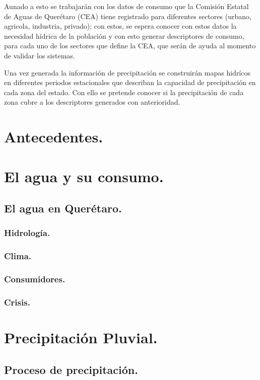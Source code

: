 \documentclass[letterpaper,12pt,oneside]{book}
\newcommand{\figura}[4]
{
  \begin{figure}[H]
    \centering
    \texttt{[image: \#2]}
    \caption{#3}
    \label{#4}
  \end{figure}
}
\begin{document}
    Aunado a esto se trabajarán con los datos de consumo que la Comisión Estatal de Aguas de Querétaro (CEA) tiene  registrado para diferentes sectores (urbano, agricola, industria, privado); con estos, se espera conocer con estos datos la necesidad hídrica de la población y con esto generar descriptores de consumo, para cada uno de los sectores que define la CEA, que serán de ayuda al momento de validar los sistemas.

    Una vez generada la información de precipitación se construirán mapas hidrícos en diferentes periodos estacionales que describan la capacidad de precipitación en cada zona del estado. Con ello se pretende conocer si la precipitación de cada zona cubre a los descriptores generados con anterioridad.
\newpage
\tableofcontents

\mainmatter

\chapter{Antecedentes.} 
\chapter{El agua y su consumo.}
    \section{El agua en Querétaro.}
        \subsection{Hidrología.}
        \subsection{Clima.}
        \subsection{Consumidores.}
        \subsection{Crisis.}
\chapter{Precipitación Pluvial.} 
    \section{Proceso de precipitación.}
\end{document}
